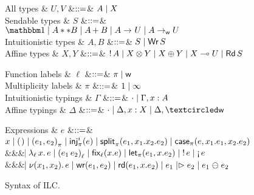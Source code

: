 \begin{figure*}[t]
  \centering
  \begin{minipage}{.58\textwidth}
    \centering
    \begin{grammar}
        All types
      & $U, V$
        &$\bnfas$& $A \bnfalt X$
      \\
      Sendable types
      & $S$
      &$\bnfas$& $\tyUnit \bnfalt A ** B \bnfalt \tySum{A}{}{B} \bnfalt
      \tyArr{A}{}{U} \bnfalt \tyArr{A}{\wm}{U}$
      \\
      Intuitionistic types
      & $A,B$
      &$\bnfas$& $S \bnfalt \tyWr{S}$
      \\
      Affine types
      & $X,Y$
      &$\bnfas$& $\tyBang{A} \bnfalt
      \tyTensor{X}{Y} \bnfalt \tyOplus{X}{Y} \bnfalt X \multimap U \bnfalt \tyRd{S}$
    \end{grammar}      
  \end{minipage}%
  \begin{minipage}{.42\textwidth}
    \centering
    \begin{grammar}
      Function labels
      & $\ell$
      &$\bnfas$& $\pi \bnfalt \wm$      
      \\      
      Multiplicity labels
      & $\pi$
      &$\bnfas$& $1 \bnfalt \infty$      
      \\
      Intuitionistic typings
      & $\Gamma$
      &$\bnfas$& $\emptyctxt \bnfalt \Gamma,x:A$
      \\
      Affine typings
      & $\Delta$
      &$\bnfas$& $\emptyctxt \bnfalt \Delta,x:X \bnfalt \Delta, \wrtok$
    \end{grammar}    
  \end{minipage}
  \begin{grammar}
    Expressions
    & $e$
    &$\bnfas$&
    $\eVar{x} \bnfalt \eUnit \bnfalt \ePair{e_1}{e_2}{\pi} \bnfalt \eInj{i}{e}
    \bnfalt \eSplit{e_1}{x_1}{x_2}{e_2} \bnfalt
    \eCase{\pi}{e}{x_1}{e_1}{x_2}{e_2}$
    \\ &&& $\bnfaltbrk \eLamm{\ell}{x}{e} \bnfalt \eApp{e_1}{e_2}{\ell} \bnfalt \eFixx{\ell}{x}{e}
    \bnfalt \eLet{x}{e_1}{e_2} \bnfalt \eBang{e} \bnfalt \eUnbang{e}$
    \\ &&& $\bnfaltbrk \eNu{(x_1,x_2)}{e} \bnfalt \eWr{e_1}{e_2} \bnfalt
    \eLetRd{e_1}{x}{e_2} \bnfalt \eFork{e_1}{e_2} \bnfalt \eChoice{e_1}{e_2}$
  \end{grammar}      
  \caption{Syntax of ILC.}
  \label{fig:ilc-syntax}
\end{figure*}
